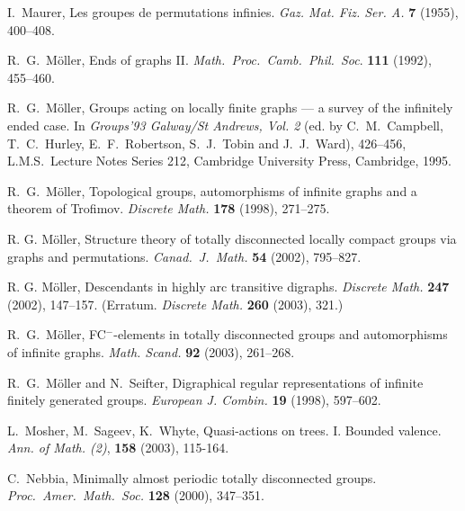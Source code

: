 \documentclass{emsprocart}
\theoremstyle{definition}
\begin{document}
\begin{thebibliography}{99}
  I.~Maurer,
                 Les groupes de permutations infinies.
                 {\em Gaz. Mat. Fiz. Ser. A.} {\bf 7} (1955), 400--408.

 R.~G.~M\"oller,
                Ends of graphs II.  {\em Math.\ Proc.\ Camb.\ Phil.\ Soc}.
                {\bf 111} (1992), 455--460.

 R.~G.~M\"oller,
                Groups acting on locally finite graphs --- a
                survey of the infinitely ended case.
                In {\em Groups'93 Galway/St Andrews, Vol. 2}
                (ed. by C.~M.~Campbell, T.~C.~Hurley, E.~F.~Robertson,
                S.~J.~Tobin and J.~J.~Ward),  426--456,
                L.M.S.~Lecture Notes Series 212,
                Cambridge University Press, Cambridge, 1995.

 R.~G.~M\"oller,
                Topological groups, automorphisms of infinite graphs and
                a theorem of Trofimov.
                {\em Discrete Math.} {\bf 178} (1998), 271--275.

 R. G. M\"oller,
                Structure theory of totally disconnected locally
                compact groups via graphs and permutations.
                {\em Canad.~J.~Math.} {\bf 54} (2002), 795--827.

 R. G. M\"oller,
                Descendants in highly arc transitive digraphs.
                {\em Discrete Math.} {\bf 247} (2002), 147--157.
                (Erratum. {\em Discrete Math.} {\bf 260} (2003),  321.)

 R.\ G.\ M\"oller,
                FC$^-$-elements in totally disconnected groups and
                automorphisms of infinite graphs.
                {\em Math. Scand.} {\bf 92} (2003), 261--268.

 R.~G.~M\"oller and N.~Seifter,
                 Digraphical regular representations of infinite
                 finitely generated groups.
                 {\em European J. Combin.} {\bf 19}  (1998), 597--602.

 L.~Mosher, M.~Sageev, K.~Whyte,
                Quasi-actions on trees. I. Bounded valence.
                {\em Ann. of Math. (2)}, {\bf 158} (2003), 115-164.

 C.\ Nebbia,
                Minimally almost periodic totally disconnected groups.
                {\em Proc.\ Amer.\ Math.\ Soc.} {\bf 128} (2000), 347--351.


\end{thebibliography}
\end{document}
